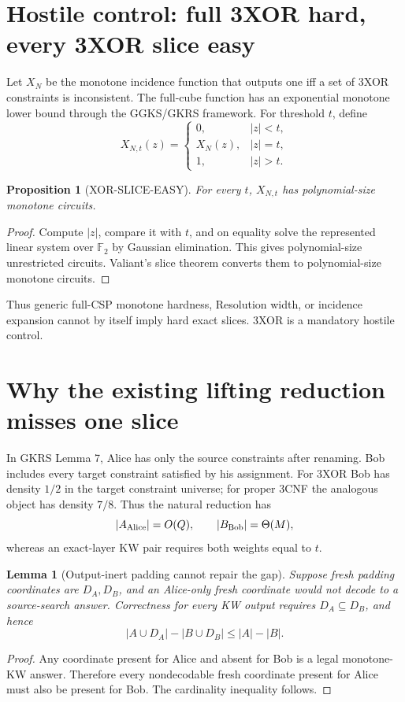 \documentclass[11pt]{article}
\newtheorem{proposition}{Proposition}
\newtheorem{lemma}{Lemma}
\begin{document}
\section{Hostile control: full 3XOR hard, every 3XOR slice easy}

Let \(X_N\) be the monotone incidence function that outputs one iff a set of 3XOR constraints is inconsistent. The full-cube function has an exponential monotone lower bound through the GGKS/GKRS framework. For threshold \(t\), define
\[
X_{N,t}(z)=
\begin{cases}
0,&|z|<t,\\
X_N(z),&|z|=t,\\
1,&|z|>t.
\end{cases}
\]

\begin{proposition}[XOR-SLICE-EASY]
For every \(t\), \(X_{N,t}\) has polynomial-size monotone circuits.
\end{proposition}

\begin{proof}
Compute \(|z|\), compare it with \(t\), and on equality solve the represented linear system over \(\mathbb F_2\) by Gaussian elimination. This gives polynomial-size unrestricted circuits. Valiant's slice theorem converts them to polynomial-size monotone circuits.
\end{proof}

Thus generic full-CSP monotone hardness, Resolution width, or incidence expansion cannot by itself imply hard exact slices. 3XOR is a mandatory hostile control.

\section{Why the existing lifting reduction misses one slice}

In GKRS Lemma 7, Alice has only the source constraints after renaming. Bob includes every target constraint satisfied by his assignment. For 3XOR Bob has density \(1/2\) in the target constraint universe; for proper 3CNF the analogous object has density \(7/8\). Thus the natural reduction has
\[
|A_{\rm Alice}|=O(Q),\qquad |B_{\rm Bob}|=\Theta(M),
\]
whereas an exact-layer KW pair requires both weights equal to \(t\).

\begin{lemma}[Output-inert padding cannot repair the gap]
Suppose fresh padding coordinates are \(D_A,D_B\), and an Alice-only fresh coordinate would not decode to a source-search answer. Correctness for every KW output requires \(D_A\subseteq D_B\), and hence
\[
|A\cup D_A|-|B\cup D_B|\le |A|-|B|.
\]
\end{lemma}
\begin{proof}
Any coordinate present for Alice and absent for Bob is a legal monotone-KW answer. Therefore every nondecodable fresh coordinate present for Alice must also be present for Bob. The cardinality inequality follows.
\end{proof}
\end{document}
